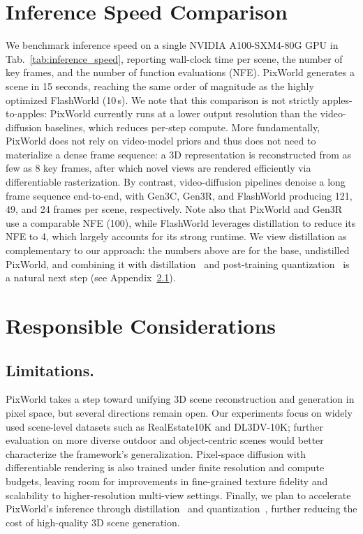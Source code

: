 \section{Inference Speed Comparison}
\label{sec:appendix_speed}
We benchmark inference speed on a single NVIDIA A100-SXM4-80G GPU in Tab.~\ref{tab:inference_speed}, reporting wall-clock time per scene, the number of key frames, and the number of function evaluations (NFE). PixWorld generates a scene in 15 seconds, reaching the same order of magnitude as the highly optimized FlashWorld (10\,s). We note that this comparison is not strictly apples-to-apples: PixWorld currently runs at a lower output resolution than the video-diffusion baselines, which reduces per-step compute. More fundamentally, PixWorld does not rely on video-model priors and thus does not need to materialize a dense frame sequence: a 3D representation is reconstructed from as few as 8 key frames, after which novel views are rendered efficiently via differentiable rasterization. By contrast, video-diffusion pipelines denoise a long frame sequence end-to-end, with Gen3C, Gen3R, and FlashWorld producing 121, 49, and 24 frames per scene, respectively. Note also that PixWorld and Gen3R use a comparable NFE (100), while FlashWorld leverages distillation to reduce its NFE to 4, which largely accounts for its strong runtime. We view distillation as complementary to our approach: the numbers above are for the base, undistilled PixWorld, and combining it with distillation~\citep{yin2024one,yin2024improved} and post-training quantization~\citep{li2023q,shang2023post} is a natural next step (see Appendix~\ref{apdx:limitations}).



\section{Responsible Considerations}
\label{appendix:responsible}

\subsection{Limitations.}
\label{apdx:limitations}

PixWorld takes a step toward unifying 3D scene reconstruction and generation in pixel space, but several directions remain open. Our experiments focus on widely used scene-level datasets such as RealEstate10K and DL3DV-10K; further evaluation on more diverse outdoor and object-centric scenes would better characterize the framework's generalization. Pixel-space diffusion with differentiable rendering is also trained under finite resolution and compute budgets, leaving room for improvements in fine-grained texture fidelity and scalability to higher-resolution multi-view settings. Finally, we plan to accelerate PixWorld's inference through distillation~\citep{yin2024one,yin2024improved} and quantization~\citep{li2023q,shang2023post}, further reducing the cost of high-quality 3D scene generation.



